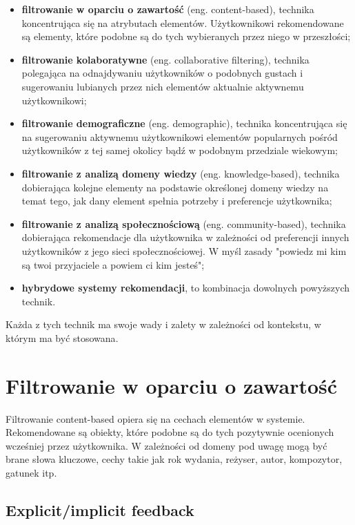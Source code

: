 \documentclass[twoside]{iisthesis}
\begin{document}
	 \begin{itemize}
	 	\item \textbf{filtrowanie w oparciu o zawartość} (eng. content-based), technika koncentrująca się na atrybutach elementów. Użytkownikowi rekomendowane są elementy, które podobne są do tych wybieranych przez niego w przeszłości;
	 	\item \textbf{filtrowanie kolaboratywne} (eng. collaborative filtering), technika polegająca na odnajdywaniu użytkowników o podobnych gustach i sugerowaniu lubianych przez nich elementów aktualnie aktywnemu użytkownikowi;
	 	\item \textbf{filtrowanie demograficzne} (eng. demographic), technika koncentrująca się na sugerowaniu aktywnemu użytkownikowi elementów popularnych pośród użytkowników z tej samej okolicy bądź w podobnym przedziale wiekowym;
	 	\item \textbf{filtrowanie z analizą domeny wiedzy} (eng. knowledge-based), technika dobierająca kolejne elementy na podstawie określonej domeny wiedzy na temat tego, jak dany element spełnia potrzeby i preferencje użytkownika;	
	 	\item \textbf{filtrowanie z analizą społecznościową} (eng. community-based), technika dobierająca rekomendacje dla użytkownika w zależności od preferencji innych użytkowników z jego sieci społecznościowej. W myśl zasady "powiedz mi kim są twoi przyjaciele a powiem ci kim jesteś";
	 	\item \textbf{hybrydowe systemy rekomendacji}, to kombinacja dowolnych powyższych technik.
	 \end{itemize}
	 
	 Każda z tych technik ma swoje wady i zalety w zależności od kontekstu, w którym ma być stosowana\cite{id:IntroductionToRecommenderSystemsHandbook}. 
	 
	 \section{Filtrowanie w oparciu o zawartość}
	 
	 Filtrowanie content-based opiera się na cechach elementów w systemie. Rekomendowane są obiekty, które podobne są do tych pozytywnie ocenionych wcześniej przez użytkownika\cite{id:huynh2012modeling}. W zależności od domeny pod uwagę mogą być brane słowa kluczowe, cechy takie jak rok wydania, reżyser, autor, kompozytor, gatunek itp.
	 
	 \subsection{Explicit/implicit feedback}
	 
\end{document}
